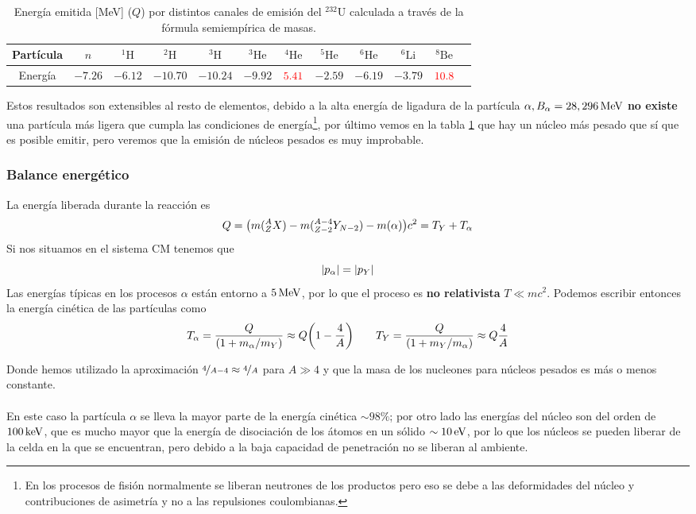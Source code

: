 \begin{table}[h!]
\centering
\begin{tabular}{|c||c|c|c|c|c|c|c|c|c|c|c|}
\hline
Partícula&$n$ & $^1\mathrm{H}$ & $^2\mathrm{H}$ & $^3\mathrm{H}$ & $^3\mathrm{He}$ & $^4\mathrm{He}$ & $^5\mathrm{He}$ & $^6\mathrm{He}$ & $^6\mathrm{Li}$ & $^8\mathrm{Be}$ \\
\hline
Energía &$-7.26$ & $-6.12$ & $-10.70$ & $-10.24$ & $-9.92$ & $\textcolor{red}{5.41}$ & $-2.59$ & $-6.19$ & $-3.79$ & $\textcolor{red}{10.8}$ \\
\hline
\end{tabular}
\caption{Energía emitida [MeV] ($Q$) por distintos canales de emisión del $^{232}\mathrm{U}$ calculada a través de la fórmula semiempírica de masas.}
\label{tab: energia emitida desintegracion alfa}
\end{table}

Estos resultados son extensibles al resto de elementos, debido a la alta energía de ligadura de la partícula $\alpha, B_\alpha=\unit[28,296]{MeV}$ \textbf{no existe} una partícula más ligera que cumpla las condiciones de energía\footnote{En los procesos de fisión normalmente se liberan neutrones de los productos pero eso se debe a las deformidades del núcleo y contribuciones de asimetría y no a las repulsiones coulombianas.}, por último vemos en la tabla \ref{tab: energia emitida desintegracion alfa} que hay un núcleo más pesado que sí que es posible emitir, pero veremos que la emisión de núcleos pesados es muy improbable.
\subsubsection{Balance energético}
La energía liberada durante la reacción es $$Q=\qty(m(^A _ZX)- m(^{A-4} _{Z-2}Y_{N-2})-m(\alpha))c^2=T_Y+T_\alpha$$ Si nos situamos en el sistema CM tenemos que $$\abs{p_\alpha}=\abs{p_Y}$$ Las energías típicas en los procesos $\alpha$ están entorno a  $\unit[5]{MeV}$, por lo que el proceso es \textbf{no relativista} $T\ll mc^2$. Podemos escribir entonces la energía cinética de las partículas como
\begin{equation}
    T_\alpha=\frac{Q}{(1+m_\alpha/m_{Y})}\approx Q\qty(1-\frac{4}{A})\quad \quad  T_Y=\frac{Q}{(1+m_Y/m_{\alpha})}\approx Q\frac{4}{A}
    \label{eq: energias cineticas desintegracion alfa}
\end{equation}

Donde hemos utilizado la aproximación $\nicefrac{4}{A-4}\approx \nicefrac{4}{A}$ para $A\gg 4$ y que la masa de los nucleones para núcleos pesados es más o menos constante. \\\\En este caso la partícula $\alpha$ se lleva la mayor parte de la energía cinética $\sim 98\%$; por otro lado las energías del núcleo son del orden de $\unit[100]{keV}$, que es mucho mayor que la energía de disociación de los átomos en un sólido $\sim \unit[10]{eV}$, por lo que los núcleos se pueden liberar de la celda en la que se encuentran, pero debido a la baja capacidad de penetración no se liberan al ambiente.
